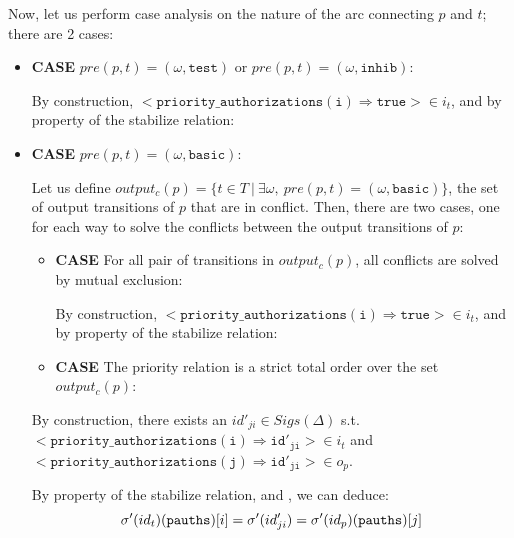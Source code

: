 \documentclass[dvipsnames,12pt]{article}
\begin{document}
\begin{niproof}
\begin{enumerate}
\begin{itemize}
      Now, let us perform case analysis on the nature of the arc
      connecting $p$ and $t$; there are 2 cases:
      
      \begin{itemize}
      \item \textbf{CASE} $pre(p,t)=(\omega,\mathtt{test})$ or
        $pre(p,t)=(\omega,\mathtt{inhib})$:

        By construction,
        ${<}\mathtt{priority\_authorizations(i)\Rightarrow{}true}{>}\in{}i_t$,
        and by property of the stabilize relation:

      \item \textbf{CASE} $pre(p,t)=(\omega,\mathtt{basic})$:

        Let us define
        $output_c(p)=\{t\in{}T~\vert~\exists{}\omega,~pre(p,t)=(\omega,\mathtt{basic})\}$,
        the set of output transitions of $p$ that are in
        conflict. Then, there are two cases, one for each way to solve
        the conflicts between the output transitions of $p$:

        \begin{itemize}
        \item \textbf{CASE} For all pair of transitions in
          $output_c(p)$, all conflicts are solved by mutual exclusion:

          By construction,
          ${<}\mathtt{priority\_authorizations(i)\Rightarrow{}true}{>}\in{}i_t$,
          and by property of the stabilize relation:
        \item \textbf{CASE} The priority relation is a strict total
          order over the set $output_c(p)$:
        \end{itemize}
        By construction, there exists an $id'_{ji}\in{}Sigs(\Delta)$
        s.t.\\
        ${<}\mathtt{priority\_authorizations(i)\Rightarrow{}id'_{ji}}{>}\in{}i_t$
        and\\
        ${<}\mathtt{priority\_authorizations(j)\Rightarrow{}id'_{ji}}{>}\in{}o_p$.

        By property of the stabilize relation, \InCsCompT{} and
        \InCsCompP, we can deduce:
        \begin{equation*}
          \label{eq:frd-eq-tpauthsi-ppauthsj}\sigma'(id_t)(\texttt{pauths})[i]=\sigma'(id'_{ji})=\sigma'(id_p)(\texttt{pauths})[j]\\
        \end{equation*}


\end{itemize}
\end{itemize}
\end{enumerate}
\end{niproof}
\end{document}

